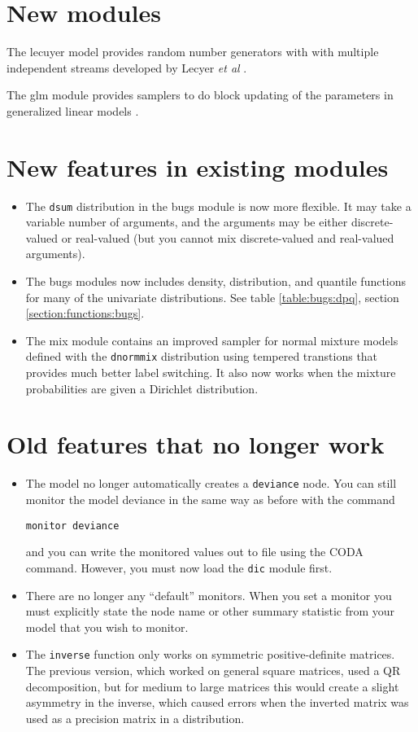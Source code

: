 \documentclass[11pt, a4paper, titlepage]{report}
\begin{document}
\section{New modules}

The \textsf{lecuyer} model provides random number generators with with
multiple independent streams developed by Lecyer {\em et al}
\cite{lecuyer02}.

The \textsf{glm} module provides samplers to do block updating of the
parameters in generalized linear models
\cite{AlbertChib93,Gamerman97,HolmesHeld06,Fruhwirth-Schnatter09}.

\section{New features in existing modules}

\begin{itemize}
\item The \texttt{dsum} distribution in the \textsf{bugs} module is now more
flexible. It may take a variable number of arguments, and the
arguments may be either discrete-valued or real-valued (but you cannot
mix discrete-valued and real-valued arguments).
\item The \textsf{bugs} modules now includes density, distribution, and
quantile functions for many of the univariate distributions. See
table \ref{table:bugs:dpq}, section \ref{section:functions:bugs}.
\item The \textsf{mix} module contains an improved sampler for normal mixture
models defined with the \verb+dnormmix+ distribution using tempered
transtions \cite{Neal94,Celeux99} that provides much better label
switching. It also now works when the mixture probabilities are given
a Dirichlet distribution.
\end{itemize}

\section{Old features that no longer work}

\begin{itemize}
\item The model no longer automatically creates a \verb+deviance+
  node. You can still monitor the model deviance in the same way as
  before with the command
\begin{verbatim}
monitor deviance
\end{verbatim}
and you can write the monitored values out to file using the CODA
command.  However, you must now load the \verb+dic+ module first.
\item There are no longer any ``default'' monitors. When you set a monitor
you must explicitly state the node name or other summary statistic
from your model that you wish to monitor.
\item The \verb+inverse+ function only works on symmetric positive-definite
matrices. The previous version, which worked on general square matrices,
used a QR decomposition, but for medium to large matrices this would create
a slight asymmetry in the inverse, which caused errors when the inverted
matrix was used as a precision matrix in a distribution.
\end{itemize}
 
\end{document}
